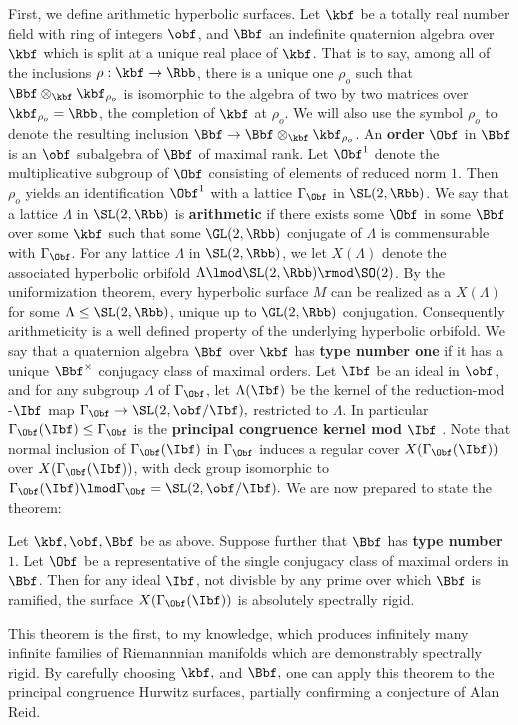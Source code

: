 \documentclass[11pt]{article}
\begin{document}
	First,  we define arithmetic hyperbolic surfaces. Let  $\kbf$ be a totally real number field with ring of integers $\obf$,  and $\Bbf$ an indefinite quaternion algebra over $\kbf$ which is split at a unique real place of $\kbf$. That is to say, among all of the inclusions $\rho:  \kbf \to \Rbb$, there is a unique  one $\rho_o$ such that $\Bbf \otimes_{\kbf}  \kbf_{\rho_o} $ is isomorphic to the algebra of two by two matrices over $\kbf_{\rho_o} =\Rbb$, the completion of $\kbf$ at $\rho_o$.  We will also use the symbol $\rho_o$ to denote the resulting inclusion $\Bbf \to \Bbf \otimes_{\kbf}  \kbf_{\rho_o} $. An {\bf order} $\Obf$ in $\Bbf$ is an $\obf$ subalgebra of $\Bbf$ of maximal rank.  Let $\Obf^1$ denote the multiplicative subgroup  of $\Obf$ consisting of elements of reduced norm  $1$.  Then $\rho_o$ yields an identification $\Obf^1$ with a lattice $\Gamma_\Obf$ in $\SL(2,\Rbb)$.  We say that a lattice $\Lambda$ in $\SL(2,\Rbb)$ is {\bf arithmetic}  if there exists some $\Obf$ in some $\Bbf$ over some $\kbf$ such that some $\GL(2,\Rbb)$ conjugate of $\Lambda$ is commensurable with $\Gamma_{\Obf}$.  For any lattice $\Lambda$ in $\SL(2,\Rbb)$, we let $X(\Lambda)$ denote the associated hyperbolic orbifold  $\Lambda \lmod \SL(2,\Rbb) \rmod  \SO(2)$. By the uniformization theorem, every hyperbolic surface $M$ can be realized as a $X(\Lambda)$ for some $\Lambda \leq \SL(2,\Rbb)$, unique up to $\GL(2,\Rbb)$  conjugation. Consequently arithmeticity is a well defined property of the underlying hyperbolic orbifold.  We say that a quaternion algebra $\Bbf$ over $\kbf$ has {\bf type number one} if it has a unique $\Bbf^\times$ conjugacy class of maximal orders.  Let $\Ibf$ be an ideal in $\obf$, and for any subgroup  $\Lambda$ of $\Gamma_\Obf$, let $\Lambda(\Ibf)$ be the kernel of the reduction-mod -$\Ibf$ map $\Gamma_\Obf \to \SL(2,\obf/\Ibf),$  restricted to $\Lambda$.  In particular $\Gamma_\Obf(\Ibf) \leq \Gamma_\Obf$ is the {\bf principal congruence kernel mod } $\Ibf$ . Note that normal inclusion of $\Gamma_\Obf(\Ibf)$ in $\Gamma_\Obf$ induces a regular cover $X(\Gamma_\Obf(\Ibf))$ over $X(\Gamma_\Obf(\Ibf))$, with deck group isomorphic to  $\Gamma_\Obf(\Ibf)  \lmod \Gamma_\Obf = \SL(2,\obf /\Ibf).$  We are now prepared to state the theorem:
	\begin{thm}
		Let $\kbf, \obf, \Bbf$ be as above. Suppose further that $\Bbf$ has {\bf type number $1$}. Let $\Obf$ be a representative of the single conjugacy class of maximal orders in $\Bbf$. Then for any ideal $\Ibf$, not divisble by any prime over which $\Bbf$ is ramified,  the surface $X(\Gamma_\Obf(\Ibf))$  is absolutely spectrally rigid. 
	\end{thm}
	This theorem is the first, to my knowledge, which  produces infinitely many infinite families of Riemannnian manifolds which are demonstrably spectrally rigid. By carefully  choosing $\kbf,$ and $\Bbf,$ one can  apply this theorem to the principal congruence Hurwitz surfaces, partially confirming a conjecture of Alan Reid. 
	
\end{document}
